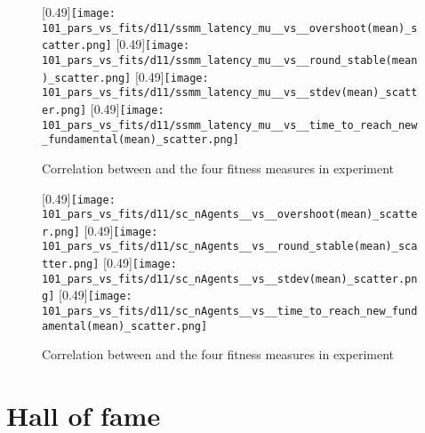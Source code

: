 \begin{figure}
	\centering
	[0.49\linewidth]{\texttt{[image: 101\_pars\_vs\_fits/d11/ssmm\_latency\_mu\_\_vs\_\_overshoot(mean)\_scatter.png]}}
	[0.49\linewidth]{\texttt{[image: 101\_pars\_vs\_fits/d11/ssmm\_latency\_mu\_\_vs\_\_round\_stable(mean)\_scatter.png]}}
	[0.49\linewidth]{\texttt{[image: 101\_pars\_vs\_fits/d11/ssmm\_latency\_mu\_\_vs\_\_stdev(mean)\_scatter.png]}}
	[0.49\linewidth]{\texttt{[image: 101\_pars\_vs\_fits/d11/ssmm\_latency\_mu\_\_vs\_\_time\_to\_reach\_new\_fundamental(mean)\_scatter.png]}}
	
	\caption{Correlation between \sclatencymu{} and the four fitness measures in experiment \deleven}
	\label{fig:d11_parvfit_ssmmlatencymu}
\end{figure}


\begin{figure}
	\centering
	[0.49\linewidth]{\texttt{[image: 101\_pars\_vs\_fits/d11/sc\_nAgents\_\_vs\_\_overshoot(mean)\_scatter.png]}}
	[0.49\linewidth]{\texttt{[image: 101\_pars\_vs\_fits/d11/sc\_nAgents\_\_vs\_\_round\_stable(mean)\_scatter.png]}}
	[0.49\linewidth]{\texttt{[image: 101\_pars\_vs\_fits/d11/sc\_nAgents\_\_vs\_\_stdev(mean)\_scatter.png]}}
	[0.49\linewidth]{\texttt{[image: 101\_pars\_vs\_fits/d11/sc\_nAgents\_\_vs\_\_time\_to\_reach\_new\_fundamental(mean)\_scatter.png]}}
	
	\caption{Correlation between \ssmmnAgents{} and the four fitness measures in experiment \deleven}
	\label{fig:d11_parvfit_scAgents}
\end{figure}


\section{Hall of fame}\label{section:hall_of_fame}
